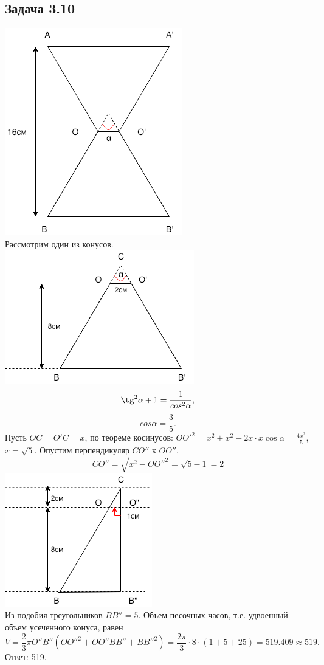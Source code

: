\documentclass[12pt]{article}
\begin{document}
\subsection*{Задача 3.10}
\includegraphics{math310}\\
Рассмотрим один из конусов.\\
\includegraphics{math310_2}\\
$$\tg^2\alpha + 1 = \frac{1}{cos^2\alpha},$$
$$cos\alpha = \frac{3}{5}.$$ 
Пусть $OC = O'C = x$, по теореме косинусов: 
$OO'^2 = x^2 + x^2 - 2x\cdot x\cos\alpha = \frac{4x^2}{5},$
$x = \sqrt{5}.$
Опустим перпендикуляр $CO''$ к $OO''$. 
$$CO'' = \sqrt{x^2 - {OO''^2}} = \sqrt{5 - 1} = 2$$ 
\includegraphics{math310_3}\\
Из подобия треугольников $BB'' = 5$. Объем песочных часов, т.е. удвоенный объем усеченного конуса, равен $$V=\frac{2}{3}\pi O''B''(OO''^2 + OO''BB'' + BB''^2)=\frac{2\pi}{3}\cdot 8 \cdot(1 + 5 + 25) = 519.409 \approx 519.$$
Ответ: 519.
\end{document}
